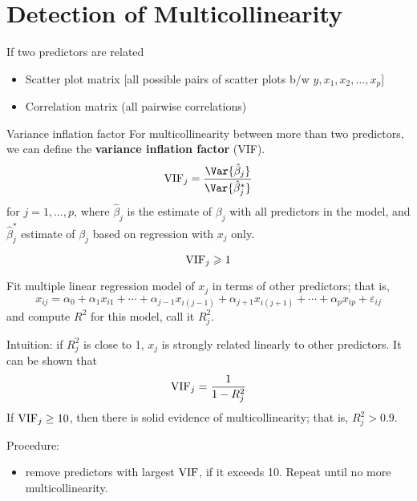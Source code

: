 \section{Detection of Multicollinearity}
If two predictors are related
\begin{itemize}
  \item Scatter plot matrix [all possible pairs of
            scatter plots b/w $ y,x_1,x_2,\ldots,x_p $]
  \item Correlation matrix (all pairwise correlations)
\end{itemize}
\begin{Definition}{Variance inflation factor}{}
  For multicollinearity between more than two
  predictors, we can define the \textbf{variance inflation factor}
  (VIF).
  \[ \VIF_j=\frac{\Var{\hat{\beta}_j}}{\Var{\hat{\beta}_j^*}} \]
  for $ j=1,\ldots,p $,
  where $ \hat{\beta}_j $ is the estimate of $ \beta_j $ with all predictors
  in the model, and $ \hat{\beta}_j^* $ estimate
  of $ \beta_j $ based on regression with $ x_j $ only.
\end{Definition}
\begin{Theorem}{}{}
  \[ \operatorname{VIF}_j\geqslant 1 \]

\end{Theorem}
Fit multiple linear regression model of $ x_j $ in terms of other predictors;
that is,
\[ x_{i j}=\alpha_0+\alpha_1x_{i1}+\cdots+\alpha_{j-1}x_{i(j-1)}+
  \alpha_{j+1}x_{i(j+1)}+\cdots+\alpha_p x_{i p}+\varepsilon_{ij} \]
and compute $ R^2 $ for this model, call it $ R_j^2 $.

Intuition: if $ R_j^2 $ is close to 1, $ x_j $ is strongly
related linearly to other predictors. It can be shown that
\[ \operatorname{VIF}_j=\frac{1}{1-R_j^2}  \]
If $ \operatorname{VIF}_j\ge 10 $, then there is solid evidence of multicollinearity;
that is, $ R_j^2>0.9 $.

Procedure:
\begin{itemize}
  \item remove predictors with largest $ \operatorname{VIF} $, if it exceeds 10.
        Repeat until no more multicollinearity.
\end{itemize}
